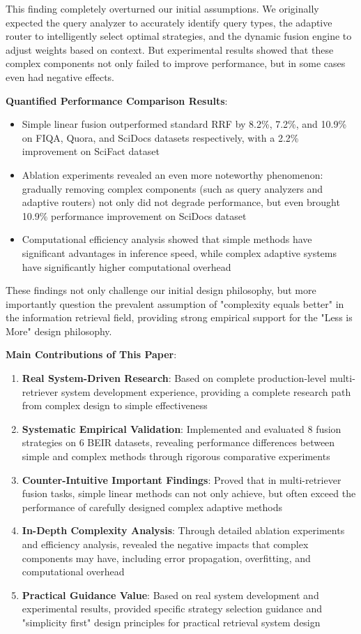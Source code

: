 \documentclass[letterpaper]{article} %
\begin{document}
This finding completely overturned our initial assumptions. We originally expected the query analyzer to accurately identify query types, the adaptive router to intelligently select optimal strategies, and the dynamic fusion engine to adjust weights based on context. But experimental results showed that these complex components not only failed to improve performance, but in some cases even had negative effects.

\textbf{Quantified Performance Comparison Results}:

\begin{itemize}
\item Simple linear fusion outperformed standard RRF by 8.2\%, 7.2\%, and 10.9\% on FIQA, Quora, and SciDocs datasets respectively, with a 2.2\% improvement on SciFact dataset
\item Ablation experiments revealed an even more noteworthy phenomenon: gradually removing complex components (such as query analyzers and adaptive routers) not only did not degrade performance, but even brought 10.9\% performance improvement on SciDocs dataset
\item Computational efficiency analysis showed that simple methods have significant advantages in inference speed, while complex adaptive systems have significantly higher computational overhead
\end{itemize}

These findings not only challenge our initial design philosophy, but more importantly question the prevalent assumption of "complexity equals better" in the information retrieval field, providing strong empirical support for the "Less is More" design philosophy.

\textbf{Main Contributions of This Paper}:

\begin{enumerate}
\item \textbf{Real System-Driven Research}: Based on complete production-level multi-retriever system development experience, providing a complete research path from complex design to simple effectiveness
\item \textbf{Systematic Empirical Validation}: Implemented and evaluated 8 fusion strategies on 6 BEIR datasets, revealing performance differences between simple and complex methods through rigorous comparative experiments
\item \textbf{Counter-Intuitive Important Findings}: Proved that in multi-retriever fusion tasks, simple linear methods can not only achieve, but often exceed the performance of carefully designed complex adaptive methods
\item \textbf{In-Depth Complexity Analysis}: Through detailed ablation experiments and efficiency analysis, revealed the negative impacts that complex components may have, including error propagation, overfitting, and computational overhead
\item \textbf{Practical Guidance Value}: Based on real system development and experimental results, provided specific strategy selection guidance and "simplicity first" design principles for practical retrieval system design
\end{enumerate}
\end{document}
